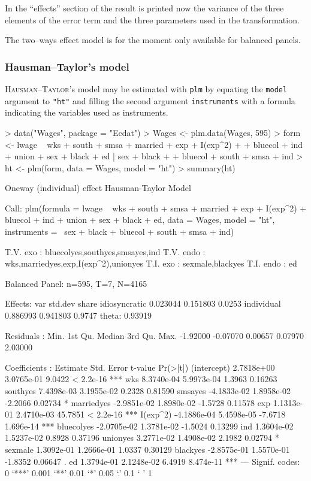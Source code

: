 \documentclass[a4paper]{article}
\begin{document}
In the ``effects'' section of the result is printed now the variance
of the three elements of the error term and the three parameters used
in the transformation. 

The two--ways effect model is for the moment only available for
balanced panels.


\subsubsection{Hausman--Taylor's model}

\textsc{Hausman}--\textsc{Taylor}'s model may be estimated with \texttt{plm}
by equating the \texttt{model} argument to  \texttt{"ht"} and
filling the second argument \texttt{instruments} with a formula
indicating the variables used as instruments.


\begin{Schunk}
\begin{Sinput}
> data("Wages", package = "Ecdat")
> Wages <- plm.data(Wages, 595)
> form <- lwage ~ wks + south + smsa + married + exp + I(exp^2) + 
+     bluecol + ind + union + sex + black + ed | sex + black + 
+     bluecol + south + smsa + ind
> ht <- plm(form, data = Wages, model = "ht")
> summary(ht)
\end{Sinput}
\begin{Soutput}
Oneway (individual) effect Hausman-Taylor Model

Call:
plm(formula = lwage ~ wks + south + smsa + married + exp + I(exp^2) + 
    bluecol + ind + union + sex + black + ed, data = Wages, model = "ht", 
    instruments = ~sex + black + bluecol + south + smsa + ind)

T.V. exo  : bluecolyes,southyes,smsayes,ind
T.V. endo : wks,marriedyes,exp,I(exp^2),unionyes
T.I. exo  : sexmale,blackyes
T.I. endo : ed

Balanced Panel: n=595, T=7, N=4165

Effects:
                   var  std.dev  share
idiosyncratic 0.023044 0.151803 0.0253
individual    0.886993 0.941803 0.9747
theta:  0.93919  

Residuals :
    Min.  1st Qu.   Median  3rd Qu.     Max. 
-1.92000 -0.07070  0.00657  0.07970  2.03000 

Coefficients :
               Estimate  Std. Error t-value  Pr(>|t|)    
(intercept)  2.7818e+00  3.0765e-01  9.0422 < 2.2e-16 ***
wks          8.3740e-04  5.9973e-04  1.3963   0.16263    
southyes     7.4398e-03  3.1955e-02  0.2328   0.81590    
smsayes     -4.1833e-02  1.8958e-02 -2.2066   0.02734 *  
marriedyes  -2.9851e-02  1.8980e-02 -1.5728   0.11578    
exp          1.1313e-01  2.4710e-03 45.7851 < 2.2e-16 ***
I(exp^2)    -4.1886e-04  5.4598e-05 -7.6718 1.696e-14 ***
bluecolyes  -2.0705e-02  1.3781e-02 -1.5024   0.13299    
ind          1.3604e-02  1.5237e-02  0.8928   0.37196    
unionyes     3.2771e-02  1.4908e-02  2.1982   0.02794 *  
sexmale      1.3092e-01  1.2666e-01  1.0337   0.30129    
blackyes    -2.8575e-01  1.5570e-01 -1.8352   0.06647 .  
ed           1.3794e-01  2.1248e-02  6.4919 8.474e-11 ***
---
Signif. codes:  0 ‘***’ 0.001 ‘**’ 0.01 ‘*’ 0.05 ‘.’ 0.1 ‘ ’ 1 


\end{Soutput}
\end{Schunk}
\end{document}
